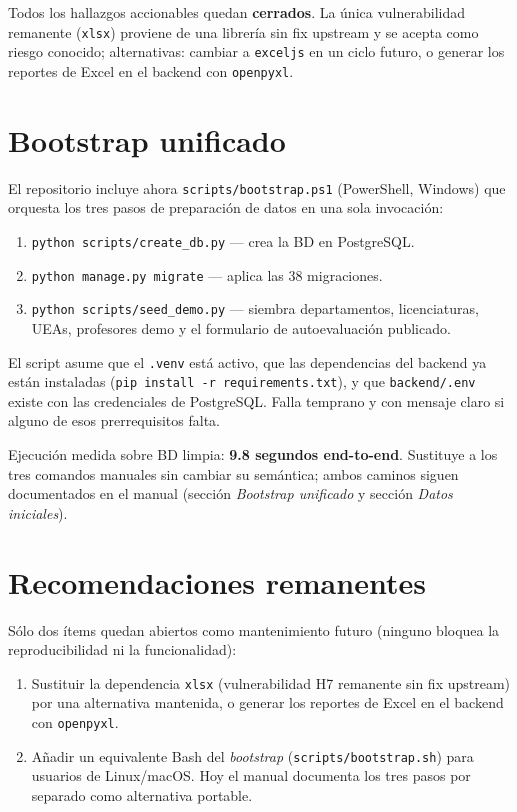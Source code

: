 \documentclass{computacion}
\begin{document}
Todos los hallazgos accionables quedan \textbf{cerrados}. La única vulnerabilidad remanente (\texttt{xlsx}) proviene de una librería sin fix upstream y se acepta como riesgo conocido; alternativas: cambiar a \texttt{exceljs} en un ciclo futuro, o generar los reportes de Excel en el backend con \texttt{openpyxl}.

\section{Bootstrap unificado}

El repositorio incluye ahora \texttt{scripts/bootstrap.ps1} (PowerShell, Windows) que orquesta los tres pasos de preparación de datos en una sola invocación:

\begin{enumerate}
    \item \texttt{python scripts/create\_db.py} — crea la BD en PostgreSQL.
    \item \texttt{python manage.py migrate} — aplica las 38 migraciones.
    \item \texttt{python scripts/seed\_demo.py} — siembra departamentos, licenciaturas, UEAs, profesores demo y el formulario de autoevaluación publicado.
\end{enumerate}

El script asume que el \texttt{.venv} está activo, que las dependencias del backend ya están instaladas (\texttt{pip install -r requirements.txt}), y que \texttt{backend/.env} existe con las credenciales de PostgreSQL. Falla temprano y con mensaje claro si alguno de esos prerrequisitos falta.

Ejecución medida sobre BD limpia: \textbf{9.8 segundos end-to-end}. Sustituye a los tres comandos manuales sin cambiar su semántica; ambos caminos siguen documentados en el manual (sección \emph{Bootstrap unificado} y sección \emph{Datos iniciales}).

\section{Recomendaciones remanentes}

Sólo dos ítems quedan abiertos como mantenimiento futuro (ninguno bloquea la reproducibilidad ni la funcionalidad):

\begin{enumerate}
    \item Sustituir la dependencia \texttt{xlsx} (vulnerabilidad H7 remanente sin fix upstream) por una alternativa mantenida, o generar los reportes de Excel en el backend con \texttt{openpyxl}.
    \item Añadir un equivalente Bash del \emph{bootstrap} (\texttt{scripts/bootstrap.sh}) para usuarios de Linux/macOS. Hoy el manual documenta los tres pasos por separado como alternativa portable.
\end{enumerate}
\end{document}

